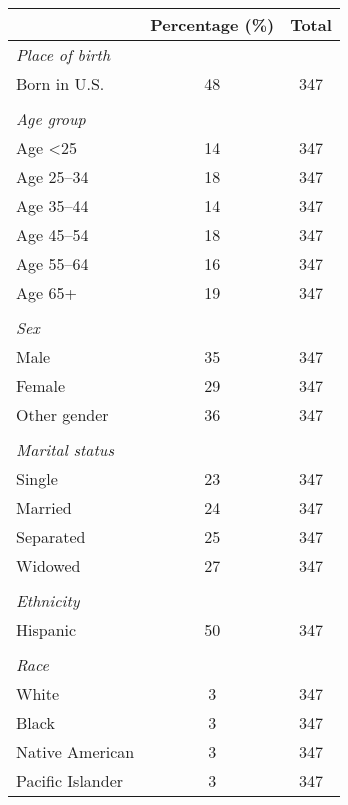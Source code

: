 \begin{tabular}{l*{1}{cc}}
\toprule
                &Percentage (\%)&    Total\\
\midrule
\emph{Place of birth}&         &         \\
Born in U.S.    &       48&      347\\
\vspace{0.1em} \\ \emph{Age group}&         &         \\
Age <25         &       14&      347\\
Age 25–34       &       18&      347\\
Age 35–44       &       14&      347\\
Age 45–54       &       18&      347\\
Age 55–64       &       16&      347\\
Age 65+         &       19&      347\\
\vspace{0.1em} \\ \emph{Sex}&         &         \\
Male            &       35&      347\\
Female          &       29&      347\\
Other gender    &       36&      347\\
\vspace{0.1em} \\ \emph{Marital status}&         &         \\
Single          &       23&      347\\
Married         &       24&      347\\
Separated       &       25&      347\\
Widowed         &       27&      347\\
\vspace{0.1em} \\ \emph{Ethnicity}&         &         \\
Hispanic        &       50&      347\\
\vspace{0.1em} \\ \emph{Race}&         &         \\
White           &        3&      347\\
Black           &        3&      347\\
Native American &        3&      347\\
Pacific Islander&        3&      347\\

\end{tabular}
